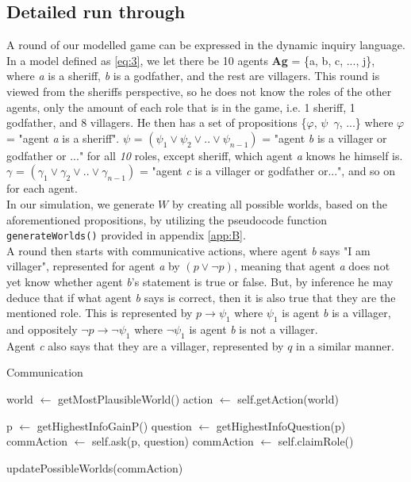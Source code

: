 \subsection{Detailed run through}\label{ARoundOfTheGame}
A round of our modelled game can be expressed in the dynamic inquiry language.
In a model defined as \cref{eq:3}, we let there be 10 agents \textbf{Ag} = \{a,
b, c, ..., j\}, where \textit{a} is a sheriff, \textit{b} is a godfather, and
the rest are villagers. This round is viewed from the sheriffs perspective, so
he does not know the roles of the other agents, only the amount of each role
that is in the game, i.e. 1 sheriff, 1 godfather, and 8 villagers. He then has
a set of propositions \{$\varphi$, $\psi$\, $\gamma$, ...\} where $\varphi$ =
"agent \textit{a} is a sheriff". $\psi$ = $(\psi_1 \lor \psi_2 \lor .. \lor
	\psi_{n-1})$ = "agent \textit{b} is a villager or godfather or ..." for all
\textit{10} roles, except sheriff, which agent \textit{a} knows he himself is.
$\gamma$ = $(\gamma_1 \lor \gamma_2 \lor .. \lor \gamma_{n-1}) $ = "agent
\textit{c} is a villager or godfather or...", and so on for each agent. \\ In
our simulation, we generate $W$ by creating all possible worlds, based on the
aforementioned propositions, by utilizing the pseudocode function
\lstinline{generateWorlds()} provided in appendix \ref{app:B}. \\ A round then
starts with communicative actions, where agent \textit{b} says "I am villager",
represented for agent \textit{a} by $(p \lor \neg p)$, meaning that agent
\textit{a} does not yet know whether agent \textit{b}'s statement is true or
false. But, by inference he may deduce that if what agent \textit{b} says is
correct, then it is also true that they are the mentioned role. This is
represented by $p \rightarrow \psi_1$ where $\psi_1$ is agent \textit{b} is a
villager, and oppositely $\neg p \rightarrow \neg \psi_1$ where $\neg \psi_1$
is agent \textit{b} is not a villager. \\ Agent \textit{c} also says that they
are a villager, represented by $q$ in a similar manner.

\begin{algorithm}
	\caption{Communication}
	\begin{algorithmic}[1]
		\State world $\gets$ getMostPlausibleWorld()
		\State action $\gets$ self.getAction(world)

		\State p $\gets$ getHighestInfoGainP()
		\State question $\gets$ getHighestInfoQuestion(p)
		\State commAction $\gets$ self.ask(p, question)
		\State commAction $\gets$ self.claimRole()
		\EndIf

		\State updatePossibleWorlds(commAction)
		\EndFunction
	\end{algorithmic}
\end{algorithm}\label{lst:communicate}

